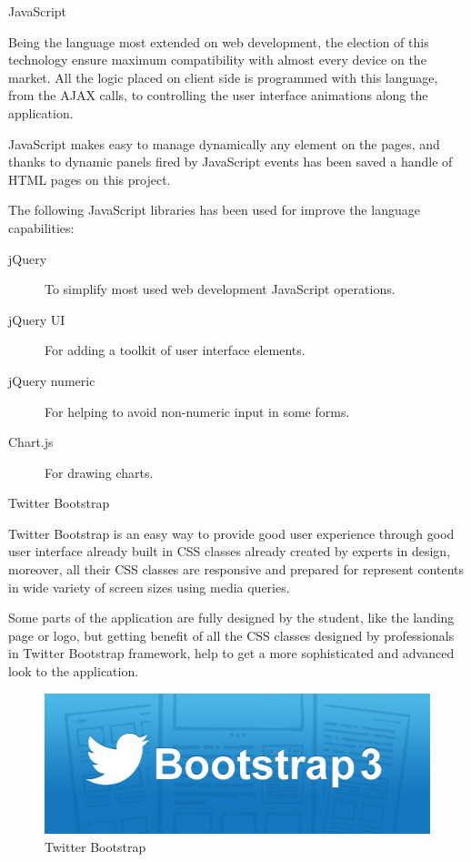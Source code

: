 \documentclass{DeustoFDP}
\begin{document}
{\large JavaScript}

Being the language most extended on web development, the election of this technology ensure maximum compatibility with almost every device on the market. All the logic placed on client side is programmed with this language, from the AJAX calls, to controlling the user interface animations along the application.

JavaScript makes easy to manage dynamically any element on the pages, and thanks to dynamic panels fired by JavaScript events has been saved a handle of HTML pages on this project.

The following JavaScript libraries has been used for improve the language capabilities:
\begin{description}
	\item[jQuery] To simplify most used web development JavaScript operations.
	\item[jQuery UI] For adding a toolkit of user interface elements.
	\item[jQuery numeric] For helping to avoid non-numeric input in some forms.
	\item[Chart.js] For drawing charts.
\end{description}

{\large Twitter Bootstrap}

Twitter Bootstrap is an easy way to provide good user experience through good user interface already built in CSS classes already created by experts in design, moreover, all their CSS classes are responsive and prepared for represent contents in wide variety of screen sizes using media queries.

Some parts of the application are fully designed by the student, like the landing page or logo, but getting benefit of all the CSS classes designed by professionals in Twitter Bootstrap framework, help to get a more sophisticated and advanced look to the application.

\begin{figure}[h]
\centering
\includegraphics[width=0.7\linewidth]{fig/bootstrap-3}
\caption[Twitter Bootstrap]{Twitter Bootstrap}
\label{fig:bootstrap-3}
\end{figure}
\end{document}

